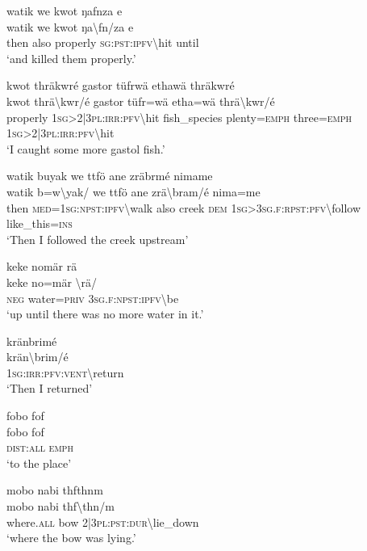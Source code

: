 \ea\label{ex:13:a1352}
watik we kwot ŋafnza e\\
\gll watik	we	kwot	ŋa{\textbackslash}fn/za	e\\
     then	also	properly	\textsc{sg}:\textsc{pst}:\textsc{ipfv}{\textbackslash}hit	until\\
\glt `and killed them properly.'
\z

\ea\label{ex:13:a1353}
kwot thräkwré gastor tüfrwä ethawä thräkwré\\
\gll kwot	thrä{\textbackslash}kwr/é	gastor	tüfr=wä	etha=wä	thrä{\textbackslash}kwr/é\\
     properly	1\textsc{sg}>2|3\textsc{pl}:\textsc{irr}:\textsc{pfv}{\textbackslash}hit	fish\_species	plenty=\textsc{emph}	three=\textsc{emph}	1\textsc{sg}>2|3\textsc{pl}:\textsc{irr}:\textsc{pfv}{\textbackslash}hit\\
\glt `I caught some more gastol fish.'
\z

\ea\label{ex:13:a1355}
watik buyak we ttfö ane zräbrmé nimame\\
\gll watik	b=w{\textbackslash}yak/	we	ttfö	ane	zrä{\textbackslash}bram/é	nima=me\\
     then	\textsc{med}=1\textsc{sg}:\textsc{npst}:\textsc{ipfv}{\textbackslash}walk	also	creek	\textsc{dem}	1\textsc{sg}>3\textsc{sg}.\textsc{f}:\textsc{rpst}:\textsc{pfv}{\textbackslash}follow	like\_this=\textsc{ins}\\
\glt `Then I followed the creek upstream'
\z

\ea\label{ex:13:a1357}
keke nomär rä\\
\gll keke	no=mär	{\textbackslash}rä/\\
     \textsc{neg}	water=\textsc{priv}	3\textsc{sg}.\textsc{f}:\textsc{npst}:\textsc{ipfv}{\textbackslash}be\\
\glt `up until there was no more water in it.'
\z

\ea\label{ex:13:a1358}
kränbrimé\\
\gll krän{\textbackslash}brim/é\\
     1\textsc{sg}:\textsc{irr}:\textsc{pfv}:\textsc{vent}{\textbackslash}return\\
\glt `Then I returned'
\z

\ea\label{ex:13:a1359}
fobo fof\\
\gll fobo	fof\\
     \textsc{dist}:\textsc{all}	\textsc{emph}\\
\glt `to the place'
\z

\ea\label{ex:13:a1360}
mobo nabi thfthnm\\
\gll mobo	nabi	thf{\textbackslash}thn/m\\
     where.\textsc{all}	bow	2|3\textsc{pl}:\textsc{pst}:\textsc{dur}{\textbackslash}lie\_down\\
\glt `where the bow was lying.'
\z

